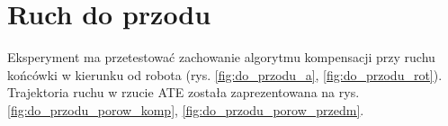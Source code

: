 
\section{Ruch do przodu}

Eksperyment ma przetestować zachowanie algorytmu kompensacji przy ruchu końcówki w kierunku od robota (rys. \ref{fig:do_przodu_a}, \ref{fig:do_przodu_rot}). Trajektoria ruchu w rzucie ATE została zaprezentowana na rys. \ref{fig:do_przodu_porow_komp}, \ref{fig:do_przodu_porow_przedm}.

